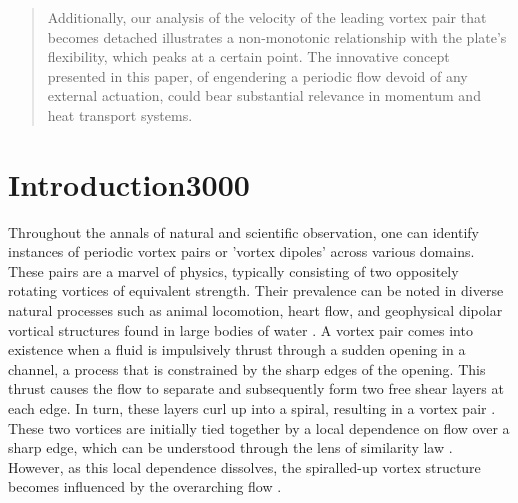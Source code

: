 \documentclass[final,3p,10pt,times,review,authoryear]{elsarticle}
\begin{document}
\begin{frontmatter}
\begin{abstract}
	Additionally, our analysis of the velocity of the leading vortex pair that becomes detached illustrates a non-monotonic relationship with the plate's flexibility, which peaks at a certain point. The innovative concept presented in this paper, of engendering a periodic flow devoid of any external actuation, could bear substantial relevance in momentum and heat transport systems.
\end{abstract}
\end{frontmatter}


%	
	\section{Introduction3000}
	\label{sec:Introduction}
	Throughout the annals of natural and scientific observation, one can identify instances of periodic vortex pairs or 'vortex dipoles' across various domains. These pairs are a marvel of physics, typically consisting of two oppositely rotating vortices of equivalent strength. Their prevalence can be noted in diverse natural processes such as animal locomotion, heart flow, and geophysical dipolar vortical structures found in large bodies of water \citep{Costello2002, gharib2005,mohseni_2015, salsac_2006, Kheradvar2010, gopalakrishnan_2014, Ahlnas1987, Borve_2021}. A vortex pair comes into existence when a fluid is impulsively thrust through a sudden opening in a channel, a process that is constrained by the sharp edges of the opening. This thrust causes the flow to separate and subsequently form two free shear layers at each edge. In turn, these layers curl up into a spiral, resulting in a vortex pair \citep{Blondeaux1983}. These two vortices are initially tied together by a local dependence on flow over a sharp edge, which can be understood through the lens of similarity law \cite{Rott1956, Pullin1978}. However, as this local dependence dissolves, the spiralled-up vortex structure becomes influenced by the overarching flow \citep{Pullin1978, pullin_perry_1980}.
	
\end{document}
